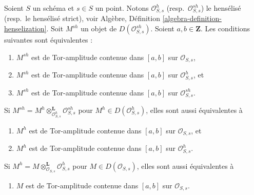 \begin{lemma}
\label{lemma-tor-amplitude-up-down-henselization}
Soient $S$ un schéma et $s \in S$ un point. Notons $\mathcal{O}_{S, s}^h$
(resp.\ $\mathcal{O}_{S, s}^{sh}$) le hensélisé (resp.\ le hensélisé
strict), voir
Algèbre, Définition \ref{algebra-definition-henselization}.
Soit $M^{sh}$ un objet de $D(\mathcal{O}_{S, s}^{sh})$.
Soient $a, b \in \mathbf{Z}$.
Les conditions suivantes sont équivalentes :
\begin{enumerate}
\item $M^{sh}$ est de Tor-amplitude contenue dans $[a, b]$ sur $\mathcal{O}_{S, s}$,
\item $M^{sh}$ est de Tor-amplitude contenue dans $[a, b]$ sur $\mathcal{O}_{S, s}^h$, et
\item $M^{sh}$ est de Tor-amplitude contenue dans $[a, b]$ sur $\mathcal{O}_{S, s}^{sh}$.
\end{enumerate}
Si $M^{sh} =
M^h \otimes_{\mathcal{O}_{S, s}^h}^\mathbf{L} \mathcal{O}_{S, s}^{sh}$
pour $M^h \in D(\mathcal{O}_{S, s}^h)$, elles sont aussi équivalentes à
\begin{enumerate}
\item[(4)] $M^h$ est de Tor-amplitude contenue dans $[a, b]$ sur $\mathcal{O}_{S, s}$, et
\item[(5)] $M^h$ est de Tor-amplitude contenue dans $[a, b]$ sur $\mathcal{O}_{S, s}^h$.
\end{enumerate}
Si $M^h = M \otimes_{\mathcal{O}_{S, s}}^\mathbf{L} \mathcal{O}_{S, s}^h$
pour $M \in D(\mathcal{O}_{S, s})$,
elles sont aussi équivalentes à
\begin{enumerate}
\item[(6)] $M$ est de Tor-amplitude contenue dans $[a, b]$ sur $\mathcal{O}_{S, s}$.
\end{enumerate}
\end{lemma}

